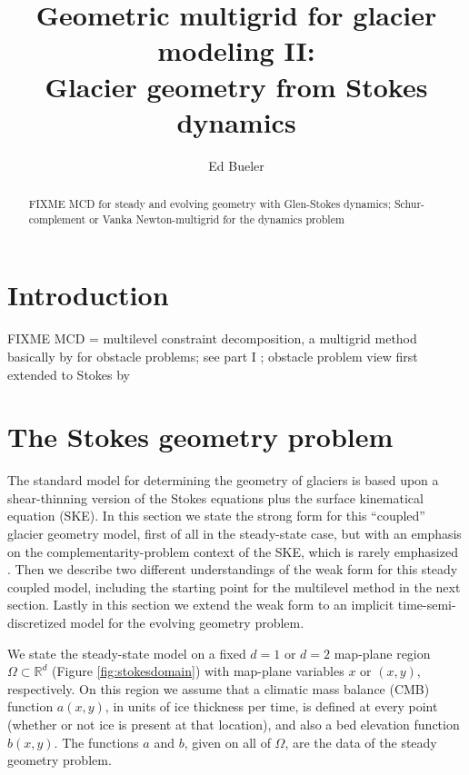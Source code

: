 \documentclass[letterpaper,final,12pt,reqno]{amsart}
\theoremstyle{claim}
\newcommand{\RR}{\mathbb{R}}
\numberwithin{equation}{section}
\numberwithin{figure}{section}
\numberwithin{table}{section}
\numberwithin{theorem}{section}
\begin{document}
\title[Geometric multigrid for glacier modeling II]{Geometric multigrid for glacier modeling II: \\ Glacier geometry from Stokes dynamics}

\author{Ed Bueler}

\begin{abstract} FIXME MCD for steady and evolving geometry with Glen-Stokes dynamics; Schur-complement or Vanka Newton-multigrid for the dynamics problem
\end{abstract}

\maketitle

\tableofcontents

\thispagestyle{empty}

\section{Introduction} \label{sec:intro}

FIXME MCD = multilevel constraint decomposition, a multigrid \cite{Trottenbergetal2001} method basically by \cite{Tai2003} for obstacle problems; see part I \cite{Bueler2022partI};  obstacle problem view first extended to Stokes by \cite{WirbelJarosch2020}


\section{The Stokes geometry problem} \label{sec:stokesgeometry}

The standard model for determining the geometry of glaciers is based upon a shear-thinning version of the Stokes equations plus the surface kinematical equation (SKE).  In this section we state the strong form for this ``coupled'' glacier geometry model, first of all in the steady-state case, but with an emphasis on the complementarity-problem context of the SKE, which is rarely emphasized \cite{SchoofHewitt2013}.  Then we describe two different understandings of the weak form for this steady coupled model, including the starting point for the multilevel method in the next section.  Lastly in this section we extend the weak form to an implicit time-semi-discretized model for the evolving geometry problem.

We state the steady-state model on a fixed $d=1$ or $d=2$ map-plane region $\Omega \subset \RR^d$ (Figure \ref{fig:stokesdomain}) with map-plane variables $x$ or $(x,y)$, respectively.  On this region we assume that a climatic mass balance (CMB) function $a(x,y)$, in units of ice thickness per time, is defined at every point (whether or not ice is present at that location), and also a bed elevation function $b(x,y)$.  The functions $a$ and $b$, given on all of $\Omega$, are the data of the steady geometry problem.
\end{document}
